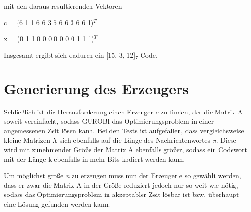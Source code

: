 \documentclass[12pt, titlepage]{article}
\begin{document}
mit den daraus resultierenden Vektoren

\begin{center}
c = (6 1 1 6 6 3 6 6 6 3 6 6 1)$^T$

x = (0 1 1 0 0 0 0 0 0 0 1 1 1)$^T$
\end{center}

Insgesamt ergibt sich dadurch ein [15, 3, 12]$_7$ Code.









\section{Generierung des Erzeugers}

Schließlich ist die Herausforderung einen Erzeuger e zu finden, der die Matrix A soweit vereinfacht, sodass GUROBI das Optimierungsproblem in einer angemessenen Zeit lösen kann.
Bei den Tests ist aufgefallen, dass vergleichsweise kleine Matrizen A sich ebenfalls auf die Länge des Nachrichtenwortes \textit{n}.
Diese wird mit zunehmender Größe der Matrix A ebenfalls größer, sodass ein Codewort mit der Länge k ebenfalls in mehr Bits kodiert werden kann.

Um möglichst große \textit{n} zu erzeugen muss nun der Erzeuger e so gewählt werden, dass er zwar die Matrix A in der Größe reduziert jedoch nur so weit wie nötig, sodass das Optimierungsproblem in akzeptabler Zeit lösbar ist bzw. überhaupt eine Lösung gefunden werden kann.
\end{document}
